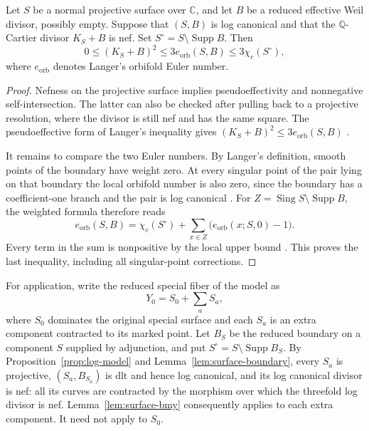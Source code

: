 \begin{lemma}
\label{lem:surface-bmy}
Let $S$ be a normal projective surface over $\mathbb C$, and let $B$ be a
reduced effective Weil divisor, possibly empty.  Suppose that $(S,B)$ is log
canonical and that the $\mathbb Q$-Cartier divisor $K_S+B$ is nef.  Set
$S^\circ=S\setminus\operatorname{Supp}B$.  Then
\[
  0\leq (K_S+B)^2
    \leq 3e_{\mathrm{orb}}(S,B)
    \leq 3\chi_c(S^\circ),
\]
where $e_{\mathrm{orb}}$ denotes Langer's orbifold Euler number.
\end{lemma}

\begin{proof}
Nefness on the projective surface implies pseudoeffectivity and nonnegative
self-intersection.  The latter can also be checked after pulling back to a
projective resolution, where the divisor is still nef and has the same square.
The pseudoeffective form of Langer's inequality gives
$(K_S+B)^2\leq3e_{\mathrm{orb}}(S,B)$
\cite[Corollary~5.2]{Langer2003}.

It remains to compare the two Euler numbers.  By Langer's definition,
smooth points of the boundary have weight zero.  At every singular point of
the pair lying on that boundary the local orbifold number is also zero, since the boundary
has a coefficient-one branch and the pair is log canonical
\cite[Theorem~7.6]{Langer2003}.  For
$Z=\operatorname{Sing}S\setminus\operatorname{Supp}B$, the weighted formula
therefore reads
\[
  e_{\mathrm{orb}}(S,B)
    =\chi_c(S^\circ)
      +\sum_{x\in Z}\bigl(e_{\mathrm{orb}}(x;S,0)-1\bigr).
\]
Every term in the sum is nonpositive by the local upper bound
\cite[Definition~3.4 and Corollary~7.8]{Langer2003}.  This proves the last
inequality, including all singular-point corrections.
\end{proof}

For application, write the reduced special fiber of the model as
\[
  Y_0=S_0+\sum_a S_a,
\]
where $S_0$ dominates the original special surface and each $S_a$ is an extra
component contracted to its marked point.  Let $B_S$ be the reduced boundary
on a component $S$ supplied by adjunction, and put
$S^\circ=S\setminus\operatorname{Supp}B_S$.
By Proposition~\ref{prop:log-model} and Lemma~\ref{lem:surface-boundary},
every $S_a$ is projective, $(S_a,B_{S_a})$ is dlt and hence log canonical, and its log
canonical divisor is nef: all its curves are contracted by the morphism over
which the threefold log divisor is nef.  Lemma~\ref{lem:surface-bmy} consequently
applies to each extra component.  It need not apply to $S_0$.

